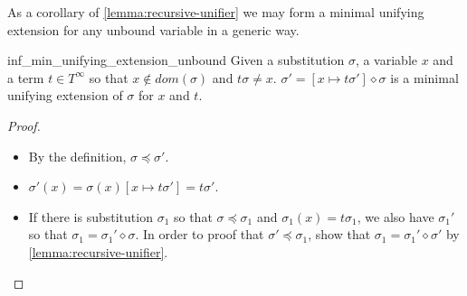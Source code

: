 As a corollary of \autoref{lemma:recursive-unifier} we may form a minimal unifying extension for any unbound variable in a generic way.

\begin{rocqlemma}{inf_min_unifying_extension_unbound}
    Given a substitution $\sigma$, a variable $x$ and a term $t \in T^\infty$ so that $x \not\in dom(\sigma)$ and $t \sigma \neq x$. $\sigma' = [x \mapsto t \sigma'] \diamond \sigma$ is a minimal unifying extension of $\sigma$ for $x$ and $t$.
    \label{lemma:unbound-unifier}
\end{rocqlemma}
\begin{proof} ~
    \begin{itemize}
        \item By the definition, $\sigma \preceq \sigma'$.
        \item $\sigma'(x) = \sigma(x) [x \mapsto t \sigma'] = t \sigma'$.
        \item If there is substitution $\sigma_1$ so that $\sigma \preceq \sigma_1$ and $\sigma_1(x) = t \sigma_1$, we also have $\sigma_1'$ so that $\sigma_1 = \sigma_1' \diamond \sigma$. In order to proof that $\sigma' \preceq \sigma_1$, show that $\sigma_1 = \sigma_1' \diamond \sigma'$ by \autoref{lemma:recursive-unifier}. 
    \end{itemize}
\end{proof}
